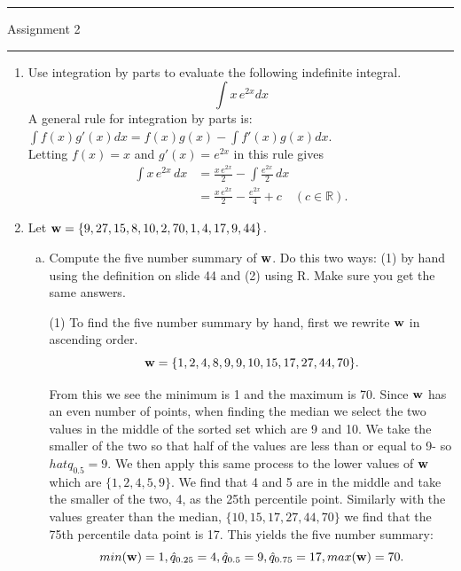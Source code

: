 \documentclass[letterpaper,12pt,fleqn]{article}
\begin{document}
\pagestyle{empty}

\hrule \vspace{0.5em}
 \hfill Assignment 2 \newline \hrule

\vspace{1em}

\begin{enumerate}
\item Use integration by parts to evaluate the following indefinite integral.
\begin{equation*}
\int x \, e^{2x} dx
\end{equation*}
A general rule for integration by parts is: $\int f(x)g'(x) dx = f(x)g(x) - \int f'(x)g(x) dx$.\\

Letting $f(x) = x$ and $g'(x) = e^{2x}$ in this rule gives
\begin{align*}
\int x \, e^{2x} \, dx &= \frac{x \, e^{2x}}{2} - \int \frac{e^{2x}}{2} \, dx \\
&= \frac{x \, e^{2x}}{2} - \frac{e^{2x}}{4} + c \quad (c \in \mathbb{R}).
\end{align*}
\vspace{1.5em}

\item Let ${\bf w} = \{9, 27, 15, 8, 10, 2, 70, 1, 4, 17, 9, 44\}$.

\begin{enumerate}[a)]
\item Compute the five number summary of ${\bf w}$.  Do this two ways: (1) by hand using the definition on slide 44 and (2) using R.  Make sure you get the same answers.

(1) To find the five number summary by hand, first we rewrite ${\bf w}$ in ascending order. 
$$ {\bf w} = \{1,2,4,8,9,9,10,15,17,27,44,70\}. $$

From this we see the minimum is 1 and the maximum is 70. Since ${\bf w}$ has an even number of points, when finding the median we select the two values in the middle of the sorted set which are 9 and 10. We take the smaller of the two so that half of the values are less than or equal to 9- so $hat{q}_{0.5} = 9$. We then apply this same process to the lower values of $\bf w$ which are $\{1,2,4,5,9\}$. We find that 4 and 5 are in the middle and take the smaller of the two, 4, as the 25th percentile point. Similarly with the values greater than the median, $\{10,15,17,27,44,70 \}$ we find that the 75th percentile data point is 17. This yields the five number summary:
$$ min({\bf w}) = 1, \hat{q}_{0.25} = 4, \hat{q}_{0.5} = 9, \hat{q}_{0.75} = 17, max({\bf w}) = 70.$$


\end{enumerate}
\end{enumerate}
\end{document}
